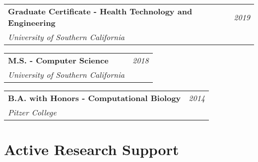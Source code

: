 \documentclass[10pt,a4paper]{article}
\begin{document}
  \vspace*{1mm}\noindent\begin{tabularx}{17cm}{X r}
    \textbf{Graduate Certificate - Health Technology and Engineering} & \textit{2019} \\ %
    \textit{University of Southern California}
  \end{tabularx} 

  \vspace*{1mm}\noindent\begin{tabularx}{17cm}{X r}
    \textbf{M.S. - Computer Science} & \textit{2018} \\ %
    \textit{University of Southern California}
  \end{tabularx} 

  \vspace*{5mm}\noindent\begin{tabularx}{17cm}{X r}
    \textbf{B.A. with Honors - Computational Biology} & \textit{2014} \\
    \textit{Pitzer College}
  \end{tabularx}

  \vspace*{2mm}\section*{Active Research Support}
\end{document}
